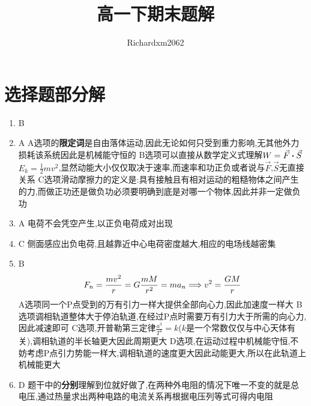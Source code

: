 \documentclass{article}
\title{高一下期末题解}
\author{Richardxm2062}
\begin{document}
    \maketitle
    \tableofcontents
    \newpage

    \section{选择题部分解}

        \begin{enumerate}
            \item B 
            \item A     \newline
            A选项的\textbf{限定词}是自由落体运动,因此无论如何只受到重力影响,无其他外力损耗该系统因此是机械能守恒的   \newline 
            B选项可以直接从数学定义式理解$ W = \vec{F} \vdot \vec{S} $ \quad $ E_{k} = \frac{1}{2} m v^{2} $,显然动能大小仅仅取决于速率,而速率和功正负或者说与$\vec{F}$,$\vec{S}$无直接关系     \newline
            C选项滑动摩擦力的定义是:具有接触且有相对运动的粗糙物体之间产生的力,而做正功还是做负功必须要明确到底是对哪一个物体,因此并非一定做负功
            \item A     \newline
            电荷不会凭空产生,以正负电荷成对出现
            \item C     \newline 
            侧面感应出负电荷,且越靠近中心电荷密度越大,相应的电场线越密集
            \item B     
            $$
            F_{n} = \frac{m v^{2}}{r} = G\frac{mM}{r^{2}} = m a_{n} \Longrightarrow v^{2} = \frac{GM}{r}
            $$
            A选项同一个P点受到的万有引力一样大提供全部向心力,因此加速度一样大   \newline
            B选项调相轨道整体大于停泊轨道,在经过P点时需要万有引力大于所需的向心力,因此减速即可  \newline
            C选项,开普勒第三定律$ \frac{a^{3}}{T^{2}} = k $($k$是一个常数仅仅与中心天体有关),调相轨道的半长轴更大因此周期更大   \newline
            D选项,在运动过程中机械能守恒,不妨考虑P点引力势能一样大,调相轨道的速度更大因此动能更大,所以在此轨道上机械能更大
            \item D     \newline
            题干中的\textbf{分别}理解到位就好做了,在两种外电阻的情况下唯一不变的就是总电压,通过热量求出两种电路的电流关系再根据电压列等式可得内电阻

\end{enumerate}
\end{document}
